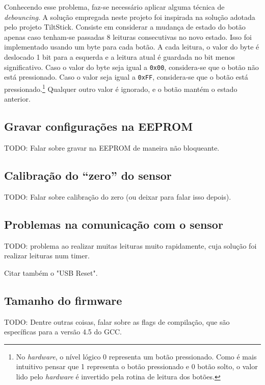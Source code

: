 \documentclass[brazil,pagestart=firstchapter]{abnt}
\begin{document}
Conhecendo esse problema, faz-se necessário aplicar alguma técnica de
\textit{debouncing}. A solução empregada neste projeto foi inspirada na
solução adotada pelo projeto TiltStick. \cite{TiltStick} Consiste em
considerar a mudança de estado do botão apenas caso tenham-se passadas 8
leituras consecutivas no novo estado. Isso foi implementado usando um byte
para cada botão. A cada leitura, o valor do byte é deslocado 1 bit para a
esquerda e a leitura atual é guardada no bit menos significativo. Caso o
valor do byte seja igual a \texttt{0x00}, considera-se que o botão não está
pressionado. Caso o valor seja igual a \texttt{0xFF}, considera-se que o
botão está pressionado.\footnote{
	No \textit{hardware}, o nível lógico 0 representa um botão pressionado.
	Como é mais intuitivo pensar que 1 representa o botão pressionado e 0
	botão solto, o valor lido pelo \textit{hardware} é invertido pela rotina
	de leitura dos botões.
} Qualquer outro valor é ignorado, e o botão mantém o estado anterior.


\subsection{Gravar configurações na EEPROM}
\label{sec:eeprom}

TODO: Falar sobre gravar na EEPROM de maneira não bloqueante.


\subsection{Calibração do ``zero'' do sensor}
\label{sec:zerocal}

TODO: Falar sobre calibração do zero (ou deixar para falar isso depois).


\subsection{Problemas na comunicação com o sensor}
\label{sec:problema_comunicacao_sensor}

TODO: problema ao realizar muitas leituras muito rapidamente, cuja solução
foi realizar leituras num timer.

Citar também o "USB Reset".


\subsection{Tamanho do firmware}
\label{sec:firmware_size}

TODO: Dentre outras coisas, falar sobre as flags de compilação, que são
específicas para a versão 4.5 do GCC.
\end{document}
